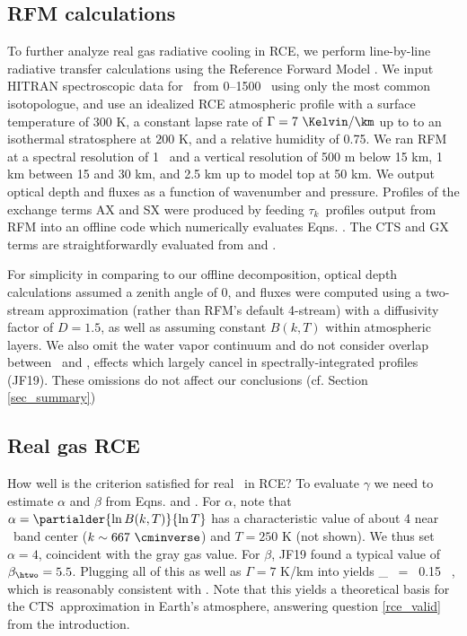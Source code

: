 \documentclass[10pt]{article}
\newcommand{\tauk}{\ensuremath{\tau_k}}
\newcommand{\CTS}{\ensuremath{\mathrm{CTS}}}
\begin{document}
\subsection{RFM calculations} \label{sec_rfm_calcs}
To further analyze real gas radiative cooling in RCE, we perform  line-by-line radiative transfer calculations using the Reference Forward Model  \citep[RFM,][]{dudhia2017}. We input  HITRAN spectroscopic data for \htwo\ from 0--1500 \cminverse\  using only the most common isotopologue, and use an idealized RCE atmospheric profile with a surface temperature of 300 K,  a constant lapse rate of $\Gamma= 7\ \Kelvin/\km$ up to to an isothermal stratosphere at $200$ K, and a relative humidity of 0.75. We ran RFM at a spectral resolution of 1 \cminverse\ and a vertical resolution of 500 m below 15 km, 1 km between 15 and 30 km, and 2.5 km up to model top at 50 km.
We output optical depth and fluxes as a function of wavenumber and pressure. Profiles of the exchange terms AX and SX  were produced by feeding \tauk\ profiles output from RFM into an offline code which numerically evaluates  Eqns. . The CTS and GX terms are straightforwardly evaluated from  and . 

 For simplicity in comparing to our offline decomposition, optical depth calculations assumed a zenith angle of 0, and fluxes   were computed using a two-stream approximation (rather than RFM's default 4-stream) with a diffusivity factor of $D=1.5$, as well as assuming constant $B(k,T)$ within atmospheric layers. We also omit the water vapor continuum and do not consider overlap between \htwo\ and \cotwo, effects which largely cancel in spectrally-integrated profiles (JF19). These omissions do not affect our conclusions (cf. Section \ref{sec_summary}) 
  
\subsection{Real gas RCE} \label{sec_real_rce}
How well is the criterion  satisfied for real  \htwo\ in RCE? To evaluate $\gamma$ we need to estimate $\alpha$ and $\beta$ from Eqns.  and . For $\alpha$, note that $\alpha = \partialder{ \ln B(k,T)}{\ln T}$ has a characteristic value of about 4 near \cotwo\ band center ($k\sim 667\ \cminverse$) and $T=250$ K (not shown). We thus set $\alpha=4$, coincident with the gray gas value. For $\beta$, JF19 found a typical value of $\beta_{\htwo} = 5.5$. Plugging all of this as well as $\Gamma=7$ K/km into  yields
	\beqn
		\gamma_{\htwo}   \ = \ 0.15  \ ,
		\label{gamma_h2o}
		\n
	\eeqn
which is reasonably consistent with . Note that this yields a theoretical basis for the \CTS\ approximation in Earth's atmosphere, answering question \ref{rce_valid} from the introduction.
\end{document}
